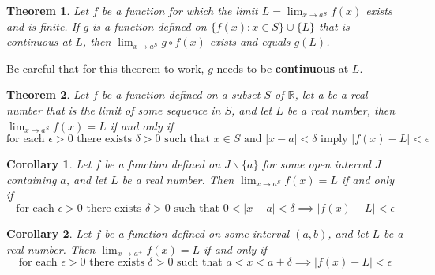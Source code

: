 \documentclass[12pt, lettersize]{book}
\theoremstyle{plain}
\newtheorem{thm}{Theorem}[section]
\newtheorem{cor}{Corollary}[thm]
\theoremstyle{definition}
\theoremstyle{remark}
\newcommand{\R}{\mathbb{R}}
\begin{document}
		\begin{thm}\label{def:20.5}
			Let $f$ be a function for which the limit $L=\lim_{x\rightarrow a^S}f(x)$ exists and is finite. If $g$ is a function defined on $\{f(x): x\in S\}\cup\{L\}$ that is continuous at $L$, then $\lim_{x\rightarrow a^S} g\circ f(x)$ exists and equals $g(L)$.
		\end{thm}
		Be careful that for this theorem to work, $g$ needs to be \textbf{continuous} at $L$.
		
		\setcounter{equation}{0}	
		\begin{thm}\label{def:20.6}
			Let $f$ be a function defined on a subset $S$ of $\R$, let a be a real number that is the limit of some sequence
			in $S$, and let $L$ be a real number, then $\lim_{x\rightarrow a^S}f(x)=L$ if and only if
			\begin{equation}
				\text{for each $\epsilon>0$ there exists $\delta>0$ such that $x\in S$ and $|x-a|<\delta$ imply $|f(x)-L|<\epsilon$}
			\end{equation}
		\end{thm}
		
		\setcounter{equation}{0}			
		\begin{cor}\label{def:20.7}
			Let $f$ be a function defined on $J\backslash\{a\}$ for some open interval $J$ containing $a$, and let $L$ be a
			real number. Then  $\lim_{x\rightarrow a^S}f(x)=L$ if and only if
			\begin{equation}
				\text{for each $\epsilon>0$ there exists $\delta>0$ such that $0<|x-a|<\delta\implies|f(x)-L|<\epsilon$}
			\end{equation}
		\end{cor}
		
		\setcounter{equation}{0}			
		\begin{cor}\label{def:20.8}
			Let $f$ be a function defined on some interval $(a,b)$, and let $L$ be a real number. Then $\lim_{x\rightarrow a^+}f(x)=L$ if and only if
			\begin{equation}
				\text{for each $\epsilon>0$ there exists $\delta>0$ such that $a<x<a+\delta\implies|f(x)-L|<\epsilon$}
			\end{equation} 
		\end{cor}
		
\end{document}

